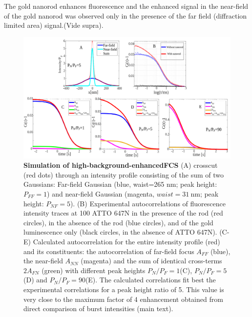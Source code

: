 The gold nanorod enhances fluorescence and the enhanced signal in the near-field of the gold nanorod was observed only in the presence of the far field (diffraction limited area) signal.(Vide supra).
\begin{figure}%
  \centering
  \includegraphics[width=\textwidth]{calc_enhc_corr}
  \makeatletter
  \renewcommand{\fnum@figure}{\figurename~S\thefigure}
  \makeatother{}
  \caption{\textbf{Simulation of high-background-enhancedFCS} (A) crosscut (red dots) through an intensity profile consisting of the sum of two Gaussians: Far-field Gaussian (blue, waist=265 nm; peak height: $P_{FF}=1$) and near-field Gaussian (magenta, $waist=\SI{31}{\nm}$; peak height: $P_{NF}=5$).
  (B) Experimental autocorrelations of fluorescence intensity traces at \SI{100}{\nM} ATTO 647N in the presence of the rod (red circles), in the absence of the rod (blue circles), and of the gold luminescence only (black circles, in the absence of ATTO 647N).
  (C-E) Calculated autocorrelation for the entire intensity profile (red) and its constituents: the autocorrelation of far-field focus $A_{FF}$ (blue), the near-field $A_{NN}$ (magenta) and the 
  sum of identical cross-terms $2A_{FN}$ (green) with different peak heights $P_{N}/P_{F}=1$(C), $P_{N}/P_{F}=5$(D) and $P_{N}/P_{F}=90$(E).
  The calculated correlations fit best the experimental correlations for a peak height ratio of 5.
  This value is very close to the maximum factor of 4 enhancement obtained from direct comparison of burst intensities (main text).}
  \label{SIfig:calc_enhc_corr}
\end{figure}


